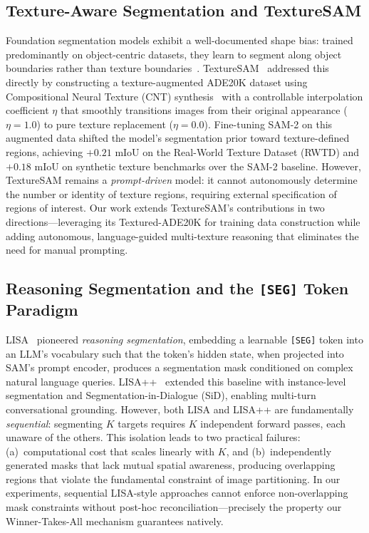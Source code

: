 \documentclass{article}
\begin{document}
\subsection{Texture-Aware Segmentation and TextureSAM}

Foundation segmentation models exhibit a well-documented shape bias: trained predominantly on object-centric datasets, they learn to segment along object boundaries rather than texture boundaries~\cite{texturesam,kth}. TextureSAM~\cite{texturesam} addressed this directly by constructing a texture-augmented ADE20K dataset using Compositional Neural Texture (CNT) synthesis~\cite{cocostuff} with a controllable interpolation coefficient $\eta$ that smoothly transitions images from their original appearance ($\eta = 1.0$) to pure texture replacement ($\eta = 0.0$). Fine-tuning SAM-2 on this augmented data shifted the model's segmentation prior toward texture-defined regions, achieving $+0.21$ mIoU on the Real-World Texture Dataset (RWTD) and $+0.18$ mIoU on synthetic texture benchmarks over the SAM-2 baseline. However, TextureSAM remains a \emph{prompt-driven} model: it cannot autonomously determine the number or identity of texture regions, requiring external specification of regions of interest. Our work extends TextureSAM's contributions in two directions---leveraging its Textured-ADE20K for training data construction while adding autonomous, language-guided multi-texture reasoning that eliminates the need for manual prompting.

\subsection{Reasoning Segmentation and the \texttt{[SEG]} Token Paradigm}

LISA~\cite{lisa} pioneered \emph{reasoning segmentation}, embedding a learnable \texttt{[SEG]} token into an LLM's vocabulary such that the token's hidden state, when projected into SAM's prompt encoder, produces a segmentation mask conditioned on complex natural language queries. LISA++~\cite{lisapp} extended this baseline with instance-level segmentation and Segmentation-in-Dialogue (SiD), enabling multi-turn conversational grounding. However, both LISA and LISA++ are fundamentally \emph{sequential}: segmenting $K$ targets requires $K$ independent forward passes, each unaware of the others. This isolation leads to two practical failures: (a)~computational cost that scales linearly with $K$, and (b)~independently generated masks that lack mutual spatial awareness, producing overlapping regions that violate the fundamental constraint of image partitioning. In our experiments, sequential LISA-style approaches cannot enforce non-overlapping mask constraints without post-hoc reconciliation---precisely the property our Winner-Takes-All mechanism guarantees natively.
\end{document}
